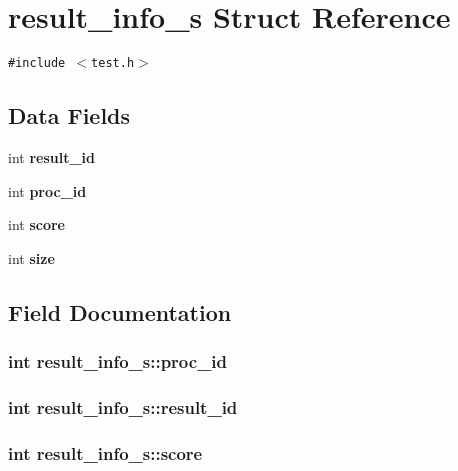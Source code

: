 \section{result\_\-info\_\-s Struct Reference}
\label{structresult__info__s}
{\tt \#include $<$test.h$>$}

\subsection*{Data Fields}
\begin{CompactItemize}
\item 
int \bf{result\_\-id}
\item 
int \bf{proc\_\-id}
\item 
int \bf{score}
\item 
int \bf{size}
\end{CompactItemize}


\subsection{Field Documentation}
\subsubsection{\setlength{\rightskip}{0pt plus 5cm}int \bf{result\_\-info\_\-s::proc\_\-id}}\label{structresult__info__s_42b3d3eb51fe1ab7cc2ff2f637384553}


\subsubsection{\setlength{\rightskip}{0pt plus 5cm}int \bf{result\_\-info\_\-s::result\_\-id}}\label{structresult__info__s_608ad6fcde0726b43753e1d97b99483c}


\subsubsection{\setlength{\rightskip}{0pt plus 5cm}int \bf{result\_\-info\_\-s::score}}\label{structresult__info__s_8b505d7702bf44bed790d351971aedc9}


